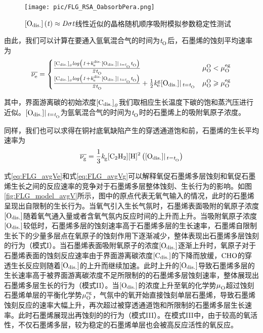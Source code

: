 \begin{figure}[htb]
    \texttt{[image: pic/FLG\_RSA\_OabsorbPera.png]}
    \caption{$\rm{\left[O_{dis.}\right]} \it\left(\it t\right)\approx \it D \sigma t$线性近似的晶格随机顺序吸附模拟参数稳定性测试}
    \label{fig:FLG_RSA_OabsorbPera}
\end{figure}

由此，我们可以计算在要通入氩氧混合气的时间为$\it{t_{\rm O}^{\rm }} \it$后，石墨烯的蚀刻平均速率为\chinesecolon
\begin{equation}
    \label{eq:FLG_avgVe}
    \overline{\nu_{\rm e}^{\rm } \it}=
    \begin{cases}
        \frac{\rm{\left[C_{dis.}\right]} \it_0 log\left( 1+\it{k_{\rm e}^{\rm dis.}} \it\rm{\left[O_{dis.}\right]} \it | \,_{t=\it{t_{\rm O}^{\rm }} \it} \it{t_{\rm O}^{\rm }} \it \right) }{\it 2 \it{t_{\rm O}^{\rm }} \it}                                                        & \mu_{\rm O}^{\rm O} \it < \mu_{\rm O}^{\rm eg} \it         \\
        \frac{\rm{\left[C_{dis.}\right]} \it_0 log\left( 1+\it{k_{\rm e}^{\rm dis.}} \it\rm{\left[O_{dis.}\right]} \it | \,_{t=\it{t_{\rm O}^{\rm }} \it} \it{t_{\rm O}^{\rm }} \it \right) }{\it 2 \it{t_{\rm O}^{\rm }} \it} + \frac{1}{2}\it{k_{\rm e}^{\rm g}} \it\rm{\left[O_{dis.}\right]} \it| \,_{t=\it{t_{\rm O}^{\rm }} \it} & \mu_{\rm O}^{\rm O} \it \geqslant \mu_{\rm O}^{\rm eg} \it
    \end{cases}
\end{equation}

其中，界面游离碳的初始浓度$\rm{\left[C_{dis.}\right]} \it_0$我们取相应生长温度下碳的饱和蒸汽压进行近似。$\rm{\left[O_{dis.}\right]} \it| \,_{t=\it{t_{\rm O}^{\rm }} \it}$为氩氧混合气的时间为$\it{t_{\rm O}^{\rm }} \it$时的石墨烯上的吸附氧原子浓度。

同样，我们也可以求得在铜衬底氧缺陷产生的穿透通道饱和前，石墨烯的生长平均速率为\chinesecolon
\begin{equation}
    \label{eq:FLG_avgVg}
    \overline{\RateV{g}{}} =\frac{1}{3}\RateK{g}{}\cemb{[C2H2]}\cemb{[H]^2}\left(\Odis |_{\,\ReactTime{}{}=\ReactTime{O}{}} \right)
\end{equation}

式\ref{eq:FLG_avgVe}和式\ref{eq:FLG_avgVg}可以解释氧促石墨烯多层蚀刻和氧促石墨烯生长之间的反应速率的竞争对于石墨烯多层整体蚀刻、生长行为的影响。如图\ref{fig:FLG_model_avgV}所示，图中的原点代表无氧气输入的情况，此时的石墨烯呈现出自限制的生长行为。当氧气引入生长气氛时，石墨烯表面吸附的氧原子浓度$\rm{\left[O_{dis.}\right]} \it$随着氧气通入量或者含氧气氛内反应时间的上升而上升。当吸附氧原子浓度$\rm{\left[O_{dis.}\right]} \it$较低时，石墨烯多层的蚀刻速率高于石墨烯多层的生长速率，石墨烯自限制生长下的少量多层点在氧原子的蚀刻作用下逐渐减少，整体表现出石墨烯多层蚀刻的行为（模式I）。当石墨烯表面吸附氧原子的浓度$\rm{\left[O_{dis.}\right]} \it$逐渐上升时，氧原子对于石墨烯表面的蚀刻反应速率由于界面游离碳浓度$\rm{\left[C_{dis.}\right]} \it$的下降而放缓，$\cemb{CHO}$的穿透生长反应则随着$\rm{\left[O_{dis.}\right]} \it$的上升而继续加速。此时上升的$\rm{\left[O_{dis.}\right]} \it$导致石墨烯多层的生长速率高于被界面游离碳浓度不足所限制的的石墨烯多层蚀刻速率，整体展现出石墨烯多层生长的行为（模式II）。当$\rm{\left[O_{dis.}\right]} \it$的浓度上升至氧的化学势$\mu_{\rm O}^{\rm } \it$超过蚀刻石墨烯单层的平衡化学势$\mu_{\rm O}^{\rm eg} \it$，气氛中的氧开始直接蚀刻单层石墨烯，导致石墨烯蚀刻反应的速率大幅上升，再次超过被穿透通道饱和所限制的石墨烯多层生长速率。此时石墨烯展现出再蚀刻的的行为（模式III）。在模式III中，由于较高的氧活性，不仅石墨烯多层，较为稳定的石墨烯单层也会被高反应活性的氧反应。

